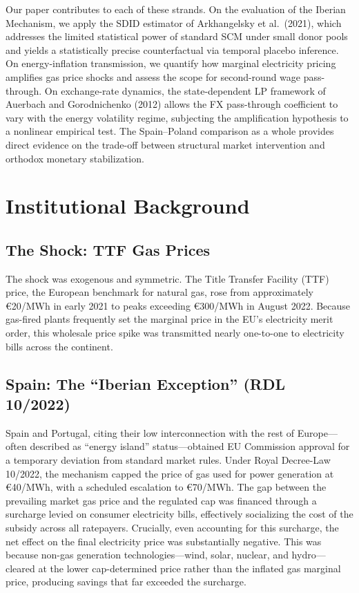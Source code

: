 \documentclass[12pt, a4paper]{article}
\begin{document}
Our paper contributes to each of these strands. On the evaluation of the Iberian Mechanism, we apply the SDID estimator of Arkhangelsky et al.\ (2021), which addresses the limited statistical power of standard SCM under small donor pools and yields a statistically precise counterfactual via temporal placebo inference. On energy-inflation transmission, we quantify how marginal electricity pricing amplifies gas price shocks and assess the scope for second-round wage pass-through. On exchange-rate dynamics, the state-dependent LP framework of Auerbach and Gorodnichenko (2012) allows the FX pass-through coefficient to vary with the energy volatility regime, subjecting the amplification hypothesis to a nonlinear empirical test. The Spain--Poland comparison as a whole provides direct evidence on the trade-off between structural market intervention and orthodox monetary stabilization. 


\section{Institutional Background}

\subsection{The Shock: TTF Gas Prices}

The shock was exogenous and symmetric. The Title Transfer Facility (TTF) price, the European benchmark for natural gas, rose from approximately \euro20/MWh in early 2021 to peaks exceeding \euro300/MWh in August 2022. Because gas-fired plants frequently set the marginal price in the EU's electricity merit order, this wholesale price spike was transmitted nearly one-to-one to electricity bills across the continent.


\subsection{Spain: The ``Iberian Exception'' (RDL 10/2022)}

Spain and Portugal, citing their low interconnection with the rest of Europe---often described as ``energy island'' status---obtained EU Commission approval for a temporary deviation from standard market rules. Under Royal Decree-Law 10/2022, the mechanism capped the price of gas used for power generation at \euro40/MWh, with a scheduled escalation to \euro70/MWh. The gap between the prevailing market gas price and the regulated cap was financed through a surcharge levied on consumer electricity bills, effectively socializing the cost of the subsidy across all ratepayers. Crucially, even accounting for this surcharge, the net effect on the final electricity price was substantially negative. This was because non-gas generation technologies---wind, solar, nuclear, and hydro---cleared at the lower cap-determined price rather than the inflated gas marginal price, producing savings that far exceeded the surcharge.
\end{document}
